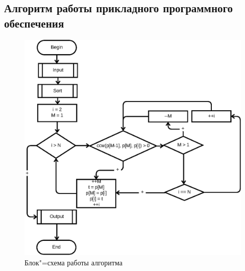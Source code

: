 \documentclass[a4paper,12pt,notitlepage,headsepline,pdftex]{scrartcl}
\begin{document}
  \subsection{Алгоритм работы прикладного программного обеспечения}
    \begin{figure}[h]
      \begin{center}
        \includegraphics{algo.eps}
      \end{center}
      \caption{Блок"=схема работы алгоритма}
      \label{fig:algo}
    \end{figure}
\end{document}
